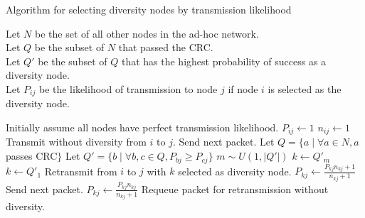 \begin{algorithm}
\caption{Algorithm for selecting diversity nodes by transmission likelihood}          
\label{alg1}
Let $N$ be the set of all other nodes in the ad-hoc network.\\
Let $Q$ be the subset of $N$ that passed the CRC.\\
Let $Q'$ be the subset of $Q$ that has the highest probability of success as a diversity node.\\
Let $P_{ij}$ be the likelihood of transmission to node $j$ if node $i$ is selected as the diversity node.
\begin{algorithmic}                    %
		\STATE Initially assume all nodes have perfect transmission likelihood.
		\STATE $P_{ij} \leftarrow 1$
		\STATE $n_{ij} \leftarrow 1$
	\ENDFOR
    \LOOP
    	\STATE Transmit without diversity from $i$ to $j$.
    		\STATE Send next packet.
    	\ELSE
    		\STATE Let $Q = \{ a \mid \forall a \in N, a $ passes CRC$\}$
			\STATE Let $Q' = \{ b \mid \forall b,c \in Q, P_{bj} \geq P_{cj}\}$
				\STATE $m \sim U(1, |Q'|)$
				\STATE $k \leftarrow Q'_m$
			\ELSE
				\STATE $k \leftarrow Q'_1$
			\ENDIF
			\STATE Retransmit from $i$ to $j$ with $k$ selected as diversity node.
				\STATE $P_{kj} \leftarrow \frac{P_{kj} n_{kj} + 1}{n_{kj} + 1}$
    			\STATE Send next packet.
    		\ELSE
    			\STATE $P_{kj} \leftarrow \frac{P_{kj} n_{kj}}{n_{kj} + 1}$
    			\STATE Requeue packet for retransmission without diversity.
    		\ENDIF
    	\ENDIF
	\ENDLOOP
\end{algorithmic}
\end{algorithm}